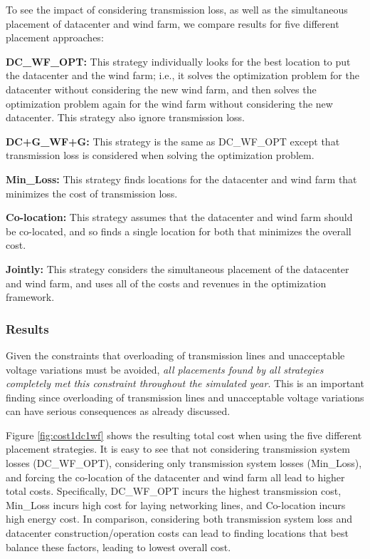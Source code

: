 To see the impact of considering transmission loss, as well as the simultaneous placement of datacenter and wind farm, we compare results for five different placement approaches:

\textbf{DC\_WF\_OPT:} This strategy individually looks for the best location to put the datacenter and the wind farm; i.e., it solves the optimization problem for the datacenter without considering the new wind farm, and then solves the optimization problem again for the wind farm without considering the new datacenter.  This strategy also ignore transmission loss.

\textbf{DC+G\_WF+G:} This strategy is the same as DC\_WF\_OPT except that transmission loss is considered when solving the optimization problem.

\textbf{Min\_Loss:} This strategy finds locations for the datacenter and wind farm that minimizes the cost of transmission loss.

\textbf{Co-location:} This strategy assumes that the datacenter and wind farm
should be co-located, and so finds a single location for both that minimizes the overall cost.

\textbf{Jointly:} This strategy considers the simultaneous placement of the datacenter and wind farm, and uses all of the costs and revenues in the optimization framework.

\subsubsection{Results}

Given the constraints that overloading of transmission lines and
unacceptable voltage variations must be avoided, {\em all placements
  found by all strategies completely met this constraint throughout
  the simulated year}.  This is an important finding since overloading
of transmission lines and unacceptable voltage variations can have
serious consequences as already discussed.

Figure \ref{fig:cost1dc1wf} shows the resulting total cost when using
the five different placement strategies.  It is easy to see that not
considering transmission system losses (DC\_WF\_OPT), considering only
transmission system losses (Min\_Loss), and forcing the co-location of
the datacenter and wind farm all lead to higher total costs.
Specifically, DC\_WF\_OPT incurs the highest transmission cost,
Min\_Loss incurs high cost for laying networking lines, and
Co-location incurs high energy cost.  In comparison, considering both
transmission system loss and datacenter construction/operation costs
can lead to finding locations that best balance these factors, leading
to lowest overall cost.

